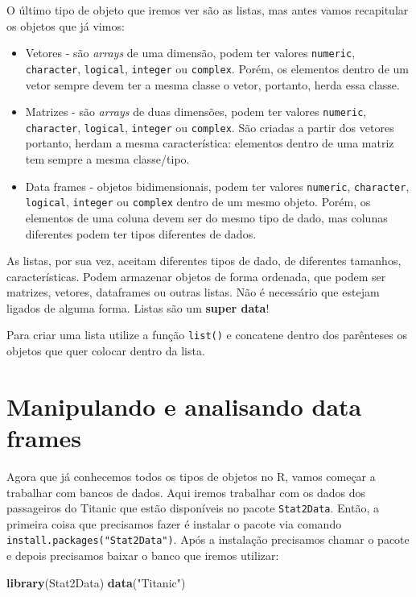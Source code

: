 \documentclass[]{book}
\newenvironment{Shaded}{\begin{snugshade}}{\end{snugshade}}
\newcommand{\KeywordTok}[1]{\textcolor[rgb]{0.13,0.29,0.53}{\textbf{#1}}}
\newcommand{\NormalTok}[1]{#1}
\newcommand{\StringTok}[1]{\textcolor[rgb]{0.31,0.60,0.02}{#1}}
\providecommand{\tightlist}{%
  \setlength{\itemsep}{0pt}\setlength{\parskip}{0pt}}
\theoremstyle{definition}
\theoremstyle{definition}
\theoremstyle{definition}
\theoremstyle{remark}
\begin{document}
O último tipo de objeto que iremos ver são as listas, mas antes vamos recapitular os objetos que já vimos:

\begin{itemize}
\tightlist
\item
  Vetores - são \emph{arrays} de uma dimensão, podem ter valores \texttt{numeric}, \texttt{character}, \texttt{logical}, \texttt{integer} ou \texttt{complex}. Porém, os elementos dentro de um vetor sempre devem ter a mesma classe o vetor, portanto, herda essa classe.
\item
  Matrizes - são \emph{arrays} de duas dimensões, podem ter valores \texttt{numeric}, \texttt{character}, \texttt{logical}, \texttt{integer} ou \texttt{complex}. São criadas a partir dos vetores portanto, herdam a mesma característica: elementos dentro de uma matriz tem sempre a mesma classe/tipo.
\item
  Data frames - objetos bidimensionais, podem ter valores \texttt{numeric}, \texttt{character}, \texttt{logical}, \texttt{integer} ou \texttt{complex} dentro de um mesmo objeto. Porém, os elementos de uma coluna devem ser do mesmo tipo de dado, mas colunas diferentes podem ter tipos diferentes de dados.
\end{itemize}

As listas, por sua vez, aceitam diferentes tipos de dado, de diferentes tamanhos, características. Podem armazenar objetos de forma ordenada, que podem ser matrizes, vetores, dataframes ou outras listas. Não é necessário que estejam ligados de alguma forma. Listas são um \textbf{super data}!

Para criar uma lista utilize a função \texttt{list()} e concatene dentro dos parênteses os objetos que quer colocar dentro da lista.

\hypertarget{manip}{%
\chapter{Manipulando e analisando data frames}\label{manip}}

Agora que já conhecemos todos os tipos de objetos no R, vamos começar a trabalhar com bancos de dados. Aqui iremos trabalhar com os dados dos passageiros do Titanic que estão disponíveis no pacote \texttt{Stat2Data}. Então, a primeira coisa que precisamos fazer é instalar o pacote via comando \texttt{install.packages("Stat2Data")}. Após a instalação precisamos chamar o pacote e depois precisamos baixar o banco que iremos utilizar:

\begin{Shaded}
\begin{Highlighting}[]
\KeywordTok{library}\NormalTok{(Stat2Data)}
\KeywordTok{data}\NormalTok{(}\StringTok{"Titanic"}\NormalTok{)}
\end{Highlighting}
\end{Shaded}
\end{document}
